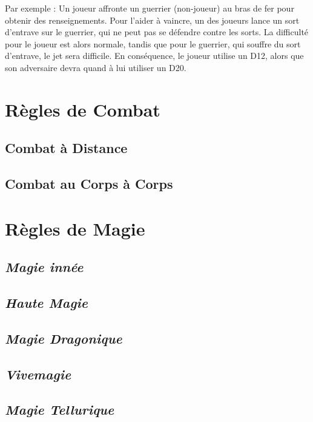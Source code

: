 Par exemple : Un joueur affronte un guerrier (non-joueur) au bras de fer  pour obtenir des renseignements. Pour l'aider à vaincre, un des joueurs lance un sort d'entrave sur le guerrier, qui ne peut pas se défendre contre les sorts. La difficulté pour le joueur est alors normale, tandis que pour le guerrier, qui souffre du sort d'entrave, le jet sera difficile. En conséquence, le joueur utilise un D12, alors que son adversaire devra quand à lui utiliser un D20.
\section{Règles de Combat}
\subsection{Combat à Distance}
\subsection{Combat au Corps à Corps}
\section{Règles de Magie}
\subsection{\em Magie innée}
\subsection{\em Haute Magie}
\subsection{\em Magie Dragonique}
\subsection{\em Vivemagie}
\subsection{\em Magie Tellurique}

